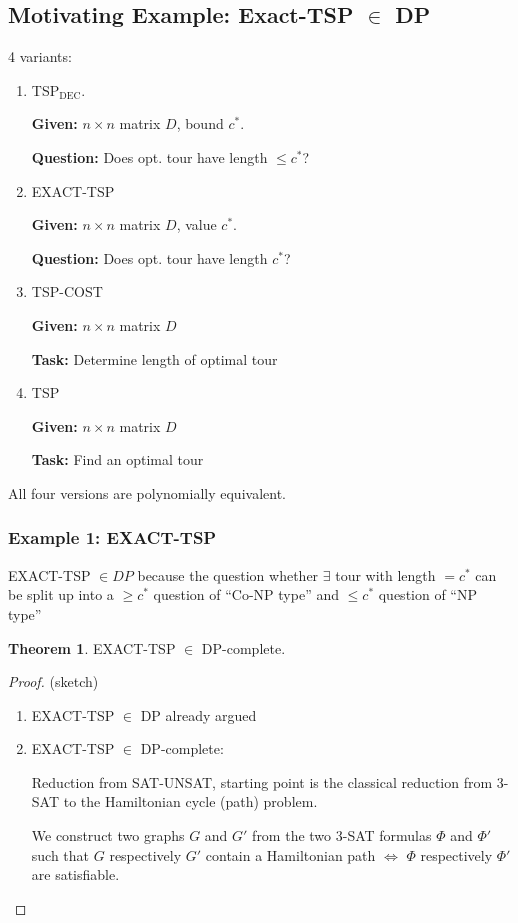 \documentclass[11pt]{article}
\theoremstyle{definition}
\newtheorem{theorem}{Theorem}[section]
\theoremstyle{definition}
\begin{document}
\subsection{Motivating Example: Exact-TSP $ \in $ DP}
4 variants:
\begin{enumerate}
\item TSP$_{\text{DEC}}$.

	\textbf{Given:} $ n \times n $ matrix $ D $, bound $ c^\ast $.
	
	\textbf{Question:} Does opt. tour have length $ \leq c^\ast $?
\item EXACT-TSP

	\textbf{Given:} $ n \times n $ matrix $ D $, value $ c^\ast $.
	
	\textbf{Question:} Does opt. tour have length $ c^\ast $?
\item TSP-COST

	\textbf{Given:} $ n \times n $ matrix $ D $
	
	\textbf{Task:} Determine length of optimal tour
\item TSP

	\textbf{Given:} $ n \times n $ matrix $ D $
	
	\textbf{Task:} Find an optimal tour
\end{enumerate}
All four versions are polynomially equivalent.

\subsubsection{Example 1: EXACT-TSP}

EXACT-TSP $ \in DP $ because the question whether $ \exists $ tour with length $ = c^\ast $ can be split up into a $ \geq c^\ast $ question of ``Co-NP type'' and $ \leq c^\ast $ question of ``NP type''

\begin{theorem}
EXACT-TSP $ \in $ DP-complete.
\end{theorem}

\begin{proof} (sketch)
\begin{enumerate}
\item
	EXACT-TSP $ \in $ DP already argued
\item
	EXACT-TSP  $ \in $ DP-complete:

	Reduction from SAT-UNSAT, starting point is the classical reduction from 3-SAT to the Hamiltonian cycle (path) problem.
	
	We construct two graphs $ G $ and $ G' $ from the two 3-SAT formulas $ \Phi $ and $ \Phi' $ such that $ G $ respectively $ G' $ contain a Hamiltonian path $ \Leftrightarrow $ $ \Phi $ respectively $ \Phi' $ are satisfiable.
\end{enumerate}
\end{proof}
	
\end{document}
